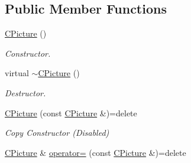 \subsection*{Public Member Functions}
\begin{DoxyCompactItemize}
\item 
\hypertarget{class_c_picture_a4e3783bef1f9d565b8a9f5e9680685ab}{\hyperlink{class_c_picture_a4e3783bef1f9d565b8a9f5e9680685ab}{C\+Picture} ()}\label{class_c_picture_a4e3783bef1f9d565b8a9f5e9680685ab}

\begin{DoxyCompactList}\small\item\em Constructor. \end{DoxyCompactList}\item 
\hypertarget{class_c_picture_a763d6f41025f8e3f39c3ed264aac623c}{virtual \hyperlink{class_c_picture_a763d6f41025f8e3f39c3ed264aac623c}{$\sim$\+C\+Picture} ()}\label{class_c_picture_a763d6f41025f8e3f39c3ed264aac623c}

\begin{DoxyCompactList}\small\item\em Destructor. \end{DoxyCompactList}\item 
\hypertarget{class_c_picture_aa74c697e3bcca50430acbfa582f7a928}{\hyperlink{class_c_picture_aa74c697e3bcca50430acbfa582f7a928}{C\+Picture} (const \hyperlink{class_c_picture}{C\+Picture} \&)=delete}\label{class_c_picture_aa74c697e3bcca50430acbfa582f7a928}

\begin{DoxyCompactList}\small\item\em Copy Constructor (Disabled) \end{DoxyCompactList}\item 
\hypertarget{class_c_picture_a8b0fe5e8e17f415d010eedab79555b6e}{\hyperlink{class_c_picture}{C\+Picture} \& \hyperlink{class_c_picture_a8b0fe5e8e17f415d010eedab79555b6e}{operator=} (const \hyperlink{class_c_picture}{C\+Picture} \&)=delete}\label{class_c_picture_a8b0fe5e8e17f415d010eedab79555b6e}


\end{DoxyCompactItemize}
